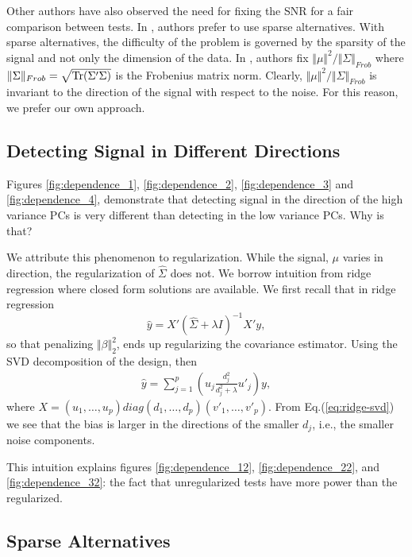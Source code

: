 \documentclass[onecolumn,draftclsnofoot]{IEEEtran}
\begin{document}
Other authors have also observed the need for fixing the SNR for a fair comparison between tests.
In \cite{ramdas2015decreasing}, authors prefer to use sparse alternatives.
With sparse alternatives, the difficulty of the problem is governed by the sparsity of the signal and not only the dimension of the data. 
In \cite{chen2010two}, authors fix $\Vert \mu \Vert^2/\Vert \Sigma \Vert_{Frob}$ where $\Vert \Sigma \Vert_{Frob}=\sqrt{\operatorname{Tr}(\Sigma'\Sigma)}$ is the Frobenius matrix norm. 
Clearly, $\Vert \mu \Vert^2/\Vert \Sigma \Vert_{Frob}$ is invariant to the direction of the signal with respect to the noise. 
For this reason, we prefer our own approach.






\subsection{Detecting Signal in Different Directions}
Figures \ref{fig:dependence_1}, \ref{fig:dependence_2}, \ref{fig:dependence_3} and \ref{fig:dependence_4}, demonstrate that detecting signal in the direction of the high variance PCs is very different than detecting in the low variance PCs.
Why is that?

We attribute this phenomenon to regularization.
While the signal, $\mu$ varies in direction, the regularization of $\hat \Sigma$ does not. 
We borrow intuition from ridge regression where closed form solutions are available. 
We first recall that in ridge regression 
$$\hat y = X'(\hat \Sigma +\lambda I)^{-1}X'y,$$
so that penalizing $\Vert \beta \Vert_2^2$, ends up regularizing the covariance estimator.
Using the SVD decomposition of the design, then 
\begin{align}
\label{eq:ridge-svd}
	\hat y= \sum_{j=1}^p \left( u_j \frac{d_j^2}{d_j^2+\lambda}u'_j \right)y,
\end{align}
where
$X=(u_1,\dots,u_p)diag(d_1,\dots,d_p)(v'_1,\dots,v'_p)$.
From Eq.(\ref{eq:ridge-svd}) we see that the bias is larger in the directions of the smaller $d_j$, i.e., the smaller noise components. 

This intuition explains figures \ref{fig:dependence_12}, \ref{fig:dependence_22}, and \ref{fig:dependence_32}: the fact that unregularized tests have more power than the regularized. 


\subsection{Sparse Alternatives}
\label{sec:sparse}
\end{document}
